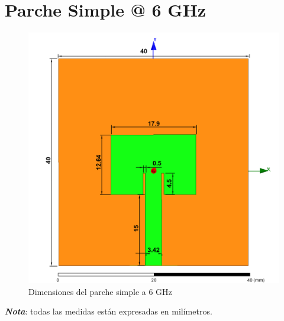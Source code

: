 \section{Parche Simple @ 6 GHz}
\vfill
\begin{figure}[H]
   	 \centering
        \includegraphics[width=\textwidth, height=\textheight, keepaspectratio=true]{archivos/desarrollo/autocad/2}
        \caption{Dimensiones del parche simple a 6 GHz}
        \label{fig:simple2}
\end{figure}

\vfill
\textit{\textbf{Nota}}: todas las medidas están expresadas en milímetros.
\newpage


